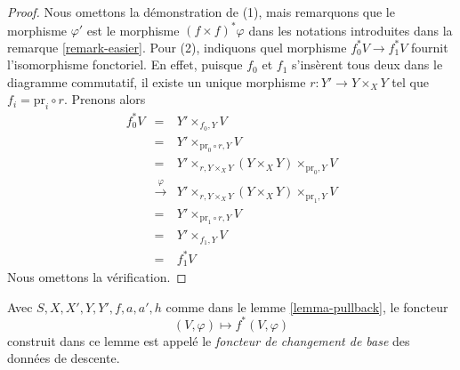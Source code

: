 \begin{proof}
Nous omettons la démonstration de (1), mais remarquons que le morphisme
$\varphi'$ est le morphisme $(f \times f)^*\varphi$ dans les
notations introduites dans la remarque \ref{remark-easier}.
Pour (2), indiquons quel morphisme
$f_0^*V \to f_1^*V$ fournit l'isomorphisme fonctoriel. En effet,
puisque $f_0$ et $f_1$ s'insèrent tous deux dans le diagramme commutatif,
il existe un unique morphisme $r : Y' \to Y \times_X Y$
tel que $f_i = \text{pr}_i \circ r$. Prenons alors
\begin{eqnarray*}
f_0^*V & = &
Y' \times_{f_0, Y} V \\
& = &
Y' \times_{\text{pr}_0 \circ r, Y} V \\
& = &
Y' \times_{r, Y \times_X Y} (Y \times_X Y) \times_{\text{pr}_0, Y} V \\
& \xrightarrow{\varphi} &
Y' \times_{r, Y \times_X Y} (Y \times_X Y) \times_{\text{pr}_1, Y} V \\
& = &
Y' \times_{\text{pr}_1 \circ r, Y} V \\
& = &
Y' \times_{f_1, Y} V \\
& = & f_1^*V
\end{eqnarray*}
Nous omettons la vérification.
\end{proof}

\begin{definition}
\label{definition-pullback-functor}
Avec $S, X, X', Y, Y', f, a, a', h$ comme dans le lemme \ref{lemma-pullback},
le foncteur
$$
(V, \varphi) \longmapsto f^*(V, \varphi)
$$
construit dans ce lemme est appelé le {\it foncteur de changement de base} des données de descente.
\end{definition}

